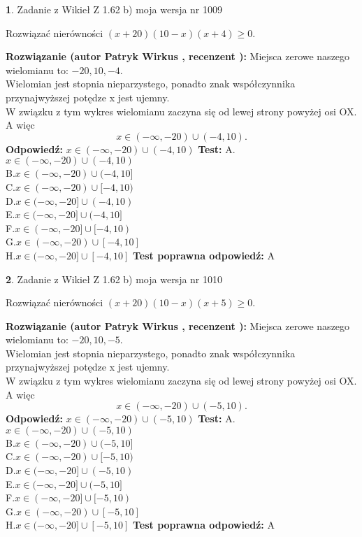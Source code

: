 \documentclass[12pt, a4paper]{article}
\theoremstyle{definition} %
\newtheorem{zad}{}
\newcommand{\zadStart}[1]{\begin{zad}#1\newline}
\newcommand{\zadStop}{\end{zad}}
\newcommand{\rozwStart}[2]{\noindent \textbf{Rozwiązanie (autor #1 , recenzent #2): }\newline}
\newcommand{\rozwStop}{\newline}
\newcommand{\odpStart}{\noindent \textbf{Odpowiedź:}\newline}
\newcommand{\odpStop}{\newline}
\newcommand{\testStart}{\noindent \textbf{Test:}\newline}
\newcommand{\testStop}{\newline}
\newcommand{\kluczStart}{\noindent \textbf{Test poprawna odpowiedź:}\newline}
\newcommand{\kluczStop}{\newline}
\begin{document}
\zadStart{Zadanie z Wikieł Z 1.62 b) moja wersja nr 1009}

Rozwiązać nierówności $(x+20)(10-x)(x+4)\ge0$.
\zadStop
\rozwStart{Patryk Wirkus}{}
Miejsca zerowe naszego wielomianu to: $-20, 10, -4$.\\
Wielomian jest stopnia nieparzystego, ponadto znak współczynnika przy\linebreak najwyższej potędze x jest ujemny.\\ W związku z tym wykres wielomianu zaczyna się od lewej strony powyżej osi OX. A więc $$x \in (-\infty,-20) \cup (-4,10).$$
\rozwStop
\odpStart
$x \in (-\infty,-20) \cup (-4,10)$
\odpStop
\testStart
A.$x \in (-\infty,-20) \cup (-4,10)$\\
B.$x \in (-\infty,-20) \cup (-4,10]$\\
C.$x \in (-\infty,-20) \cup [-4,10)$\\
D.$x \in (-\infty,-20] \cup (-4,10)$\\
E.$x \in (-\infty,-20] \cup (-4,10]$\\
F.$x \in (-\infty,-20] \cup [-4,10)$\\
G.$x \in (-\infty,-20) \cup [-4,10]$\\
H.$x \in (-\infty,-20] \cup [-4,10]$
\testStop
\kluczStart
A
\kluczStop



\zadStart{Zadanie z Wikieł Z 1.62 b) moja wersja nr 1010}

Rozwiązać nierówności $(x+20)(10-x)(x+5)\ge0$.
\zadStop
\rozwStart{Patryk Wirkus}{}
Miejsca zerowe naszego wielomianu to: $-20, 10, -5$.\\
Wielomian jest stopnia nieparzystego, ponadto znak współczynnika przy\linebreak najwyższej potędze x jest ujemny.\\ W związku z tym wykres wielomianu zaczyna się od lewej strony powyżej osi OX. A więc $$x \in (-\infty,-20) \cup (-5,10).$$
\rozwStop
\odpStart
$x \in (-\infty,-20) \cup (-5,10)$
\odpStop
\testStart
A.$x \in (-\infty,-20) \cup (-5,10)$\\
B.$x \in (-\infty,-20) \cup (-5,10]$\\
C.$x \in (-\infty,-20) \cup [-5,10)$\\
D.$x \in (-\infty,-20] \cup (-5,10)$\\
E.$x \in (-\infty,-20] \cup (-5,10]$\\
F.$x \in (-\infty,-20] \cup [-5,10)$\\
G.$x \in (-\infty,-20) \cup [-5,10]$\\
H.$x \in (-\infty,-20] \cup [-5,10]$
\testStop
\kluczStart
A
\kluczStop
\end{document}
